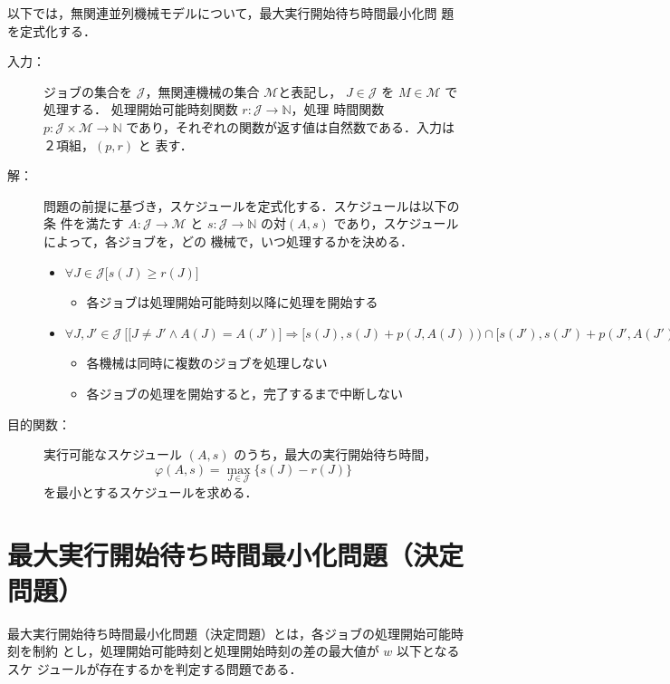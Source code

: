 \documentclass[12pt]{optlab-bachelor}
\begin{document}
以下では，無関連並列機械モデルについて，最大実行開始待ち時間最小化問
題を定式化する．
\begin{description}
  \item[入力：] ジョブの集合を $\mathcal{J}$，無関連機械の集合 $\mathcal{M}$と表記し，
  $J \in \mathcal{J}$ を $M \in \mathcal{M}$ で処理する．
  処理開始可能時刻関数 $r : \mathcal{J} \to \mathbb{N}$，処理
  時間関数 $p : \mathcal{J} \times \mathcal{M} \to \mathbb{N}$
  であり，それぞれの関数が返す値は自然数である．入力は２項組，$(p,r)$ と
  表す．
  \item[解：] 問題の前提に基づき，スケジュールを定式化する．スケジュールは以下の条
  件を満たす $A : \mathcal{J} \to \mathcal{M}$ と $s : \mathcal{J} \to
  \mathbb{N}$ の対$(A,s)$ であり，スケジュールによって，各ジョブを，どの
  機械で，いつ処理するかを決める．
  \begin{itemize}
    \item $\forall J \in \mathcal{J}\big[s(J) \ge r(J) \big]$
    \begin{itemize}
      \item 各ジョブは処理開始可能時刻以降に処理を開始する
    \end{itemize}

    \item {\scriptsize $\forall J, J' \in \mathcal{J}\ \Big[ \big[J\neq J' \land A(J) = A(J')\big] \Rightarrow [s(J), s(J)+p(J,A(J))) \cap[s(J'), s(J')+p(J', A(J'))) = \emptyset \Big]$}
    \begin{itemize}
      \item 各機械は同時に複数のジョブを処理しない
      \item 各ジョブの処理を開始すると，完了するまで中断しない
    \end{itemize}
  \end{itemize}

  \item[目的関数：] 実行可能なスケジュール $(A,s)$ のうち，最大の実行開始待ち時間，
  $$\varphi(A,s) = \displaystyle \max_{J \in \mathcal{J}}\{s(J) -
  r(J)\}$$
  を最小とするスケジュールを求める．
\end{description}

\section{最大実行開始待ち時間最小化問題（決定問題）}
最大実行開始待ち時間最小化問題（決定問題）とは，各ジョブの処理開始可能時刻を制約
とし，処理開始可能時刻と処理開始時刻の差の最大値が $w$ 以下となるスケ
ジュールが存在するかを判定する問題である．
\end{document}
